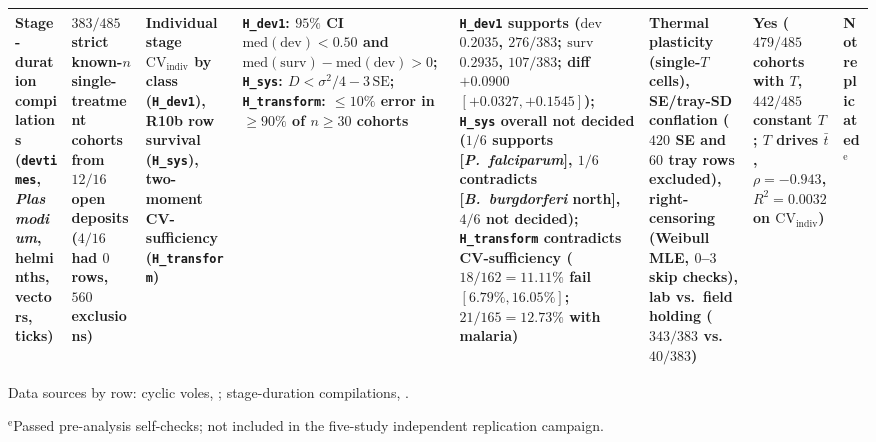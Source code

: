 \begin{table}[p]
{\begin{tabular}{@{}p{}p{}p{}p{}p{}p{}p{}p{}@{}}
Stage-duration compilations (\texttt{devtimes}, \textit{Plasmodium}, helminths, vectors, ticks) & $383/485$ strict known-$n$ single-treatment cohorts from $12/16$ open deposits ($4/16$ had $0$ rows, $560$ exclusions) & Individual stage $\mathrm{CV}_{\mathrm{indiv}}$ by class (\texttt{H\_dev1}), R10b row survival (\texttt{H\_sys}), two-moment CV-sufficiency (\texttt{H\_transform}) & \texttt{H\_dev1}: $95\%$ CI $\mathrm{med}(\text{dev}) < 0.50$ and $\mathrm{med}(\text{surv}) - \mathrm{med}(\text{dev}) > 0$; \texttt{H\_sys}: $D < \sigma^2/4 - 3\,\mathrm{SE}$; \texttt{H\_transform}: $\le 10\%$ error in $\ge 90\%$ of $n \ge 30$ cohorts & \texttt{H\_dev1} supports ($\text{dev}$ $0.2035$, $276/383$; $\text{surv}$ $0.2935$, $107/383$; diff $+0.0900$ $[+0.0327, +0.1545]$); \texttt{H\_sys} overall not decided ($1/6$ supports [\textit{P.~falciparum}], $1/6$ contradicts [\textit{B.~burgdorferi} north], $4/6$ not decided); \texttt{H\_transform} contradicts CV-sufficiency ($18/162 = 11.11\%$ fail $[6.79\%, 16.05\%]$; $21/165 = 12.73\%$ with malaria) & Thermal plasticity (single-$T$ cells), SE/tray-SD conflation ($420$ SE and $60$ tray rows excluded), right-censoring (Weibull MLE, $0$--$3$ skip checks), lab vs.\ field holding ($343/383$ vs.\ $40/383$) & Yes ($479/485$ cohorts with $T$, $442/485$ constant $T$; $T$ drives $\bar{t}$, $\rho = -0.943$, $R^2 = 0.0032$ on $\mathrm{CV}_{\mathrm{indiv}}$) & Not replicated$^{\mathrm{e}}$ \\
\bottomrule
\end{tabular}
\par\vspace{2pt}
\raggedright Data sources by row: cyclic voles, \citealp{paterson2022,jackson2014,voutilainen2016}; stage-duration compilations, \citealp{andrade2024,shapiro2017,stopard2021,fracasso2022,brunner2022,aleuy2023,johnson2023}.\par
$^{\mathrm{e}}$Passed pre-analysis self-checks; not included in the five-study independent replication campaign.}
\end{table}

